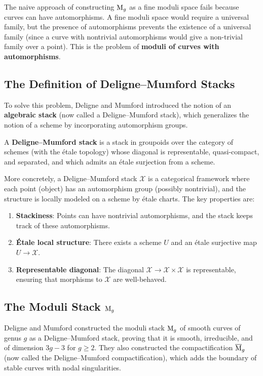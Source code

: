The naive approach of constructing \(\operatorname{M}_g\) as a fine moduli space fails because curves can have automorphisms. A fine moduli space would require a universal family, but the presence of automorphisms prevents the existence of a universal family (since a curve with nontrivial automorphisms would give a non-trivial family over a point). This is the problem of \textbf{moduli of curves with automorphisms}.

\subsection{The Definition of Deligne--Mumford Stacks}

To solve this problem, Deligne and Mumford introduced the notion of an \textbf{algebraic stack} (now called a Deligne--Mumford stack), which generalizes the notion of a scheme by incorporating automorphism groups.

\begin{definition}
A \textbf{Deligne--Mumford stack} is a stack in groupoids over the category of schemes (with the \'etale topology) whose diagonal is representable, quasi-compact, and separated, and which admits an \'etale surjection from a scheme.
\end{definition}

More concretely, a Deligne--Mumford stack \(\mathcal{X}\) is a categorical framework where each point (object) has an automorphism group (possibly nontrivial), and the structure is locally modeled on a scheme by \'etale charts. The key properties are:
\begin{enumerate}
    \item \textbf{Stackiness}: Points can have nontrivial automorphisms, and the stack keeps track of these automorphisms.
    \item \textbf{\'Etale local structure}: There exists a scheme \(U\) and an \'etale surjective map \(U \to \mathcal{X}\).
    \item \textbf{Representable diagonal}: The diagonal \(\mathcal{X} \to \mathcal{X} \times \mathcal{X}\) is representable, ensuring that morphisms to \(\mathcal{X}\) are well-behaved.
\end{enumerate}

\subsection{The Moduli Stack \texorpdfstring{\(\operatorname{M}_g\)}{Mg}}

Deligne and Mumford constructed the moduli stack \(\operatorname{M}_g\) of smooth curves of genus \(g\) as a Deligne--Mumford stack, proving that it is smooth, irreducible, and of dimension \(3g-3\) for \(g \geq 2\). They also constructed the compactification \(\overline{\operatorname{M}}_g\) (now called the Deligne--Mumford compactification), which adds the boundary of stable curves with nodal singularities.

